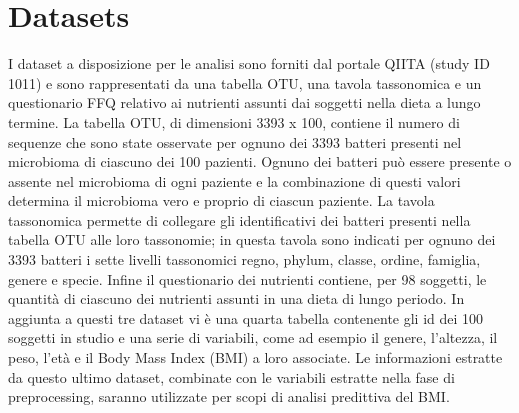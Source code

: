 \section{Datasets}
I dataset a disposizione per le analisi sono forniti dal portale QIITA (study ID 1011) e sono rappresentati da una tabella OTU, una tavola tassonomica e un questionario FFQ relativo ai nutrienti assunti dai soggetti nella dieta a lungo termine. La tabella OTU, di dimensioni 3393 x 100, contiene il numero di sequenze che sono state osservate per ognuno dei 3393 batteri presenti nel microbioma di ciascuno dei 100 pazienti. Ognuno dei batteri può essere presente o assente nel microbioma di ogni paziente e la combinazione di questi valori determina il microbioma vero e proprio di ciascun paziente. La tavola tassonomica permette di collegare gli identificativi dei batteri presenti nella tabella OTU alle loro tassonomie; in questa tavola sono indicati per ognuno dei 3393 batteri i sette livelli tassonomici regno, phylum, classe, ordine, famiglia, genere e specie. Infine il questionario dei nutrienti contiene, per 98 soggetti, le quantità di ciascuno dei nutrienti assunti in una dieta di lungo periodo. In aggiunta a questi tre dataset vi è una quarta tabella contenente gli id dei 100 soggetti in studio e una serie di variabili, come ad esempio il genere, l’altezza, il peso, l’età e il Body Mass Index (BMI) a loro associate. Le informazioni estratte da questo ultimo dataset, combinate con le variabili estratte nella fase di preprocessing, saranno utilizzate per scopi di analisi predittiva del BMI.

